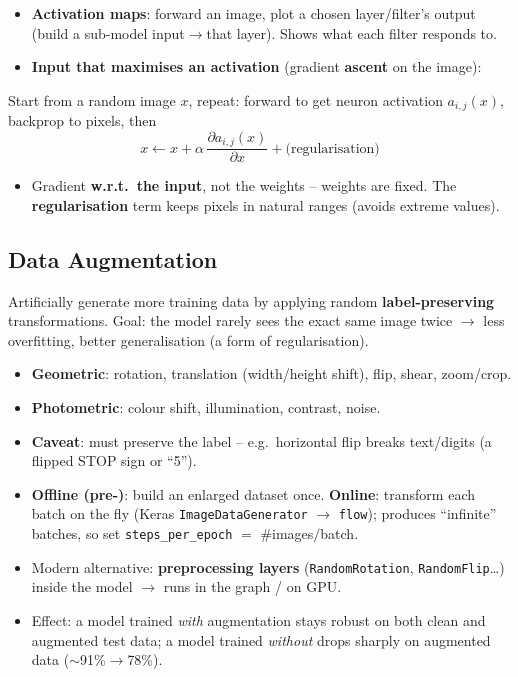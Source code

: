 \documentclass[10pt,a4paper]{article}
\begin{document}
	\begin{itemize}[leftmargin=*]
		\item \textbf{Activation maps}: forward an image, plot a chosen layer/filter's output (build a sub-model input$\rightarrow$that layer). Shows what each filter responds to.
		\item \textbf{Input that maximises an activation} (gradient \textbf{ascent} on the image):
	\end{itemize}
	\begin{formulabox}
		Start from a random image $x$, repeat: forward to get neuron activation $a_{i,j}(x)$, backprop to pixels, then
		\[
		x \leftarrow x + \alpha\,\frac{\partial a_{i,j}(x)}{\partial x} + \text{(regularisation)}
		\]
	\end{formulabox}
	\begin{itemize}[leftmargin=*]
		\item Gradient \textbf{w.r.t.\ the input}, not the weights -- weights are fixed. The \textbf{regularisation} term keeps pixels in natural ranges (avoids extreme values).
	\end{itemize}

	\subsection{Data Augmentation}

	\begin{definitionbox}
		Artificially generate more training data by applying random \textbf{label-preserving} transformations. Goal: the model rarely sees the exact same image twice $\rightarrow$ less overfitting, better generalisation (a form of regularisation).
	\end{definitionbox}

	\begin{itemize}[leftmargin=*]
		\item \textbf{Geometric}: rotation, translation (width/height shift), flip, shear, zoom/crop.
		\item \textbf{Photometric}: colour shift, illumination, contrast, noise.
		\item \textbf{Caveat}: must preserve the label -- e.g.\ horizontal flip breaks text/digits (a flipped STOP sign or ``5'').
		\item \textbf{Offline (pre-)}: build an enlarged dataset once. \textbf{Online}: transform each batch on the fly (Keras \texttt{ImageDataGenerator} $\rightarrow$ \texttt{flow}); produces ``infinite'' batches, so set \texttt{steps\_per\_epoch} $=$ \#images$/$batch.
		\item Modern alternative: \textbf{preprocessing layers} (\texttt{RandomRotation}, \texttt{RandomFlip}\dots) inside the model $\rightarrow$ runs in the graph / on GPU.
		\item Effect: a model trained \emph{with} augmentation stays robust on both clean and augmented test data; a model trained \emph{without} drops sharply on augmented data ($\sim$91\%$\to$78\%).
	\end{itemize}
\end{document}
